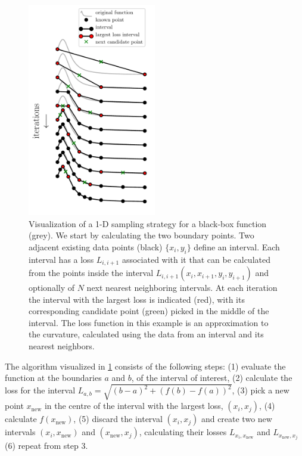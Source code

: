 \begin{figure}
\centering
\includegraphics[width=0.5\textwidth]{chapter_adaptive/figures/algo.pdf}
\caption{Visualization of a 1-D sampling strategy for a black-box function (grey).
We start by calculating the two boundary points.
Two adjacent existing data points (black) $\{x_i, y_i\}$ define an interval.
Each interval has a loss $L_{i,i+1}$ associated with it that can be calculated from the points inside the interval $L_{i,i+1}(x_i, x_{i+1}, y_i, y_{i+1})$ and optionally of $N$ next nearest neighboring intervals.
At each iteration the interval with the largest loss is indicated (red), with its corresponding candidate point (green) picked in the middle of the interval.
The loss function in this example is an approximation to the curvature, calculated using the data from an interval and its nearest neighbors.\label{fig:algo}}
\end{figure}


The algorithm visualized in \ref{fig:algo} consists of the following steps:
(1) evaluate the function at the boundaries $a$ and $b$, of the interval of interest,
(2) calculate the loss for the interval $L_{a, b} = \sqrt{(b - a)^2 + (f(b) - f(a))^2}$,
(3) pick a new point $x_\textrm{new}$ in the centre of the interval with the largest loss, $(x_i, x_j)$,
(4) calculate $f(x_\textrm{new})$,
(5) discard the interval $(x_i, x_j)$ and create two new intervals $(x_i, x_\textrm{new})$ and $(x_\textrm{new}, x_j)$, calculating their losses $L_{x_i, x_\textrm{new}}$ and $L_{x_\textrm{new}, x_j}$
(6) repeat from step 3.


